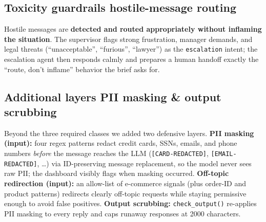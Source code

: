 \documentclass[11pt,a4paper]{article}
\newcommand{\code}[1]{\texttt{#1}}
\begin{document}
\subsection{Toxicity guardrails \textemdash{} hostile-message routing}
Hostile messages are \textbf{detected and routed appropriately without inflaming the situation}.
The supervisor flags strong frustration, manager demands, and legal threats (``unacceptable'',
``furious'', ``lawyer'') as the \code{escalation} intent; the escalation agent then responds calmly
and prepares a human handoff \textemdash{} exactly the ``route, don't inflame'' behavior the brief
asks for.

\subsection{Additional layers \textemdash{} PII masking \& output scrubbing}
Beyond the three required classes we added two defensive layers. \textbf{PII masking (input):} four
regex patterns redact credit cards, SSNs, emails, and phone numbers \emph{before} the message
reaches the LLM (\code{[CARD-REDACTED]}, \code{[EMAIL-REDACTED]}, \ldots) via ID-preserving message
replacement, so the model never sees raw PII; the dashboard visibly flags when masking occurred.
\textbf{Off-topic redirection (input):} an allow-list of e-commerce signals (plus order-ID and
product patterns) redirects clearly off-topic requests while staying permissive enough to avoid
false positives. \textbf{Output scrubbing:} \code{check\_output()} re-applies PII masking to every
reply and caps runaway responses at 2000 characters.
\end{document}
